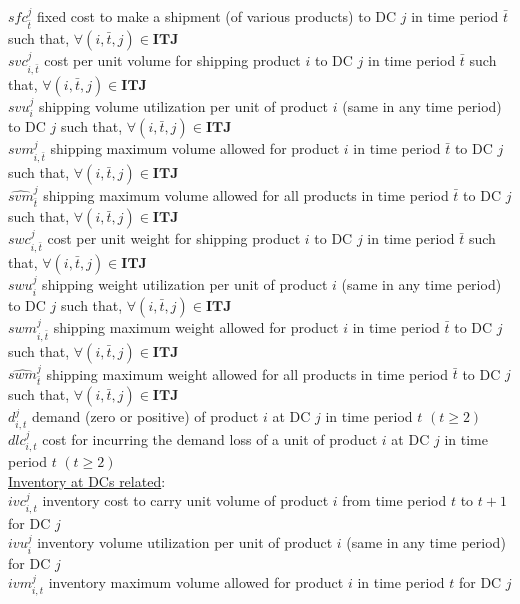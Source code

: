 \documentclass[12pt,a4paper]{article}
\begin{document}
$sfc_{\bar{t}}^{j}$ \quad fixed cost to make a shipment (of various products) to DC $j$ in time period $\bar{t}$ such that, $\forall (i,\bar{t},j)\in \textbf{ITJ}$ \\
$svc_{i,\bar{t}}^{j}$ \quad cost per unit volume for shipping product $i$ to DC $j$ in time period $\bar{t}$ such that, $\forall (i,\bar{t},j)\in \textbf{ITJ}$\\
$svu_{i}^{j}$ \quad shipping volume utilization per unit of product $i$ (same in any time period) to DC $j$ such that, $\forall (i,\bar{t},j)\in \textbf{ITJ}$\\
$svm_{i,\bar{t}}^{j}$ \quad shipping maximum volume allowed for product $i$ in time period $\bar{t}$ to DC $j$ such that, $\forall (i,\bar{t},j)\in \textbf{ITJ}$\\
$\widehat{svm}_{\bar{t}}^{j}$ \quad shipping maximum volume allowed for all products in time period $\bar{t}$ to DC $j$ such that, $\forall (i,\bar{t},j)\in \textbf{ITJ}$\\
$swc_{i,\bar{t}}^{j}$ \quad cost per unit weight for shipping product $i$ to DC $j$  in time period $\bar{t}$ such that, $\forall (i,\bar{t},j)\in \textbf{ITJ}$\\
$swu_{i}^{j}$ \quad shipping weight utilization per unit of product $i$ (same in any time period) to DC $j$ such that, $\forall (i,\bar{t},j)\in \textbf{ITJ}$\\
$swm_{i,\bar{t}}^{j}$ \quad shipping maximum weight allowed for product $i$ in time period $\bar{t}$ to DC $j$ such that, $\forall (i,\bar{t},j)\in \textbf{ITJ}$\\
$\widehat{swm}_{\bar{t}}^{j}$ \quad shipping maximum weight allowed for all products in time period $\bar{t}$ to DC $j$ such that, $\forall (i,\bar{t},j)\in \textbf{ITJ}$\\
$d_{i,t}^{j}$ \quad demand (zero or positive) of product $i$ at DC $j$ in time period $t$ $(t\geq 2)$ \\
$dlc_{i,t}^{j}$ \quad cost for incurring the demand loss of a unit of product $i$ at DC $j$ in time period $t$ $(t\geq 2)$ \\
\underline{Inventory at DCs related}: \\
$ivc_{i,t}^{j}$ \quad inventory cost to carry unit volume of product $i$ from time period $t$ to $t+1$ for DC $j$ \\
$ivu_{i}^{j}$ \quad inventory volume utilization per unit of product $i$ (same in any time period) for DC $j$ \\
$ivm_{i,t}^{j}$ \quad inventory maximum volume allowed for product $i$ in time period $t$ for DC $j$ \\
\end{document}

